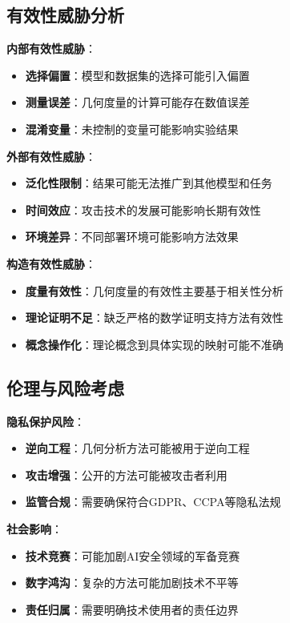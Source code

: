 \subsection{有效性威胁分析}

\textbf{内部有效性威胁}：
\begin{itemize}
\item \textbf{选择偏置}：模型和数据集的选择可能引入偏置
\item \textbf{测量误差}：几何度量的计算可能存在数值误差
\item \textbf{混淆变量}：未控制的变量可能影响实验结果
\end{itemize}

\textbf{外部有效性威胁}：
\begin{itemize}
\item \textbf{泛化性限制}：结果可能无法推广到其他模型和任务
\item \textbf{时间效应}：攻击技术的发展可能影响长期有效性
\item \textbf{环境差异}：不同部署环境可能影响方法效果
\end{itemize}

\textbf{构造有效性威胁}：
\begin{itemize}
\item \textbf{度量有效性}：几何度量的有效性主要基于相关性分析
\item \textbf{理论证明不足}：缺乏严格的数学证明支持方法有效性
\item \textbf{概念操作化}：理论概念到具体实现的映射可能不准确
\end{itemize}

\subsection{伦理与风险考虑}

\textbf{隐私保护风险}：
\begin{itemize}
\item \textbf{逆向工程}：几何分析方法可能被用于逆向工程
\item \textbf{攻击增强}：公开的方法可能被攻击者利用
\item \textbf{监管合规}：需要确保符合GDPR、CCPA等隐私法规
\end{itemize}

\textbf{社会影响}：
\begin{itemize}
\item \textbf{技术竞赛}：可能加剧AI安全领域的军备竞赛
\item \textbf{数字鸿沟}：复杂的方法可能加剧技术不平等
\item \textbf{责任归属}：需要明确技术使用者的责任边界
\end{itemize}

